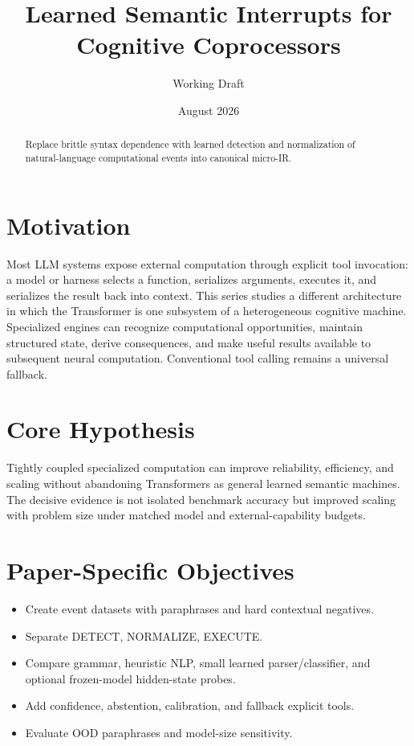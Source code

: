 \documentclass[11pt]{article}
\title{Learned Semantic Interrupts for Cognitive Coprocessors}
\author{Working Draft}
\date{August 2026}
\begin{document}
\maketitle
\begin{abstract}
Replace brittle syntax dependence with learned detection and normalization of natural-language computational events into canonical micro-IR.
\end{abstract}

\section{Motivation}
Most LLM systems expose external computation through explicit tool invocation: a model or harness selects a function, serializes arguments, executes it, and serializes the result back into context. This series studies a different architecture in which the Transformer is one subsystem of a heterogeneous cognitive machine. Specialized engines can recognize computational opportunities, maintain structured state, derive consequences, and make useful results available to subsequent neural computation. Conventional tool calling remains a universal fallback.

\section{Core Hypothesis}
Tightly coupled specialized computation can improve reliability, efficiency, and scaling without abandoning Transformers as general learned semantic machines. The decisive evidence is not isolated benchmark accuracy but improved scaling with problem size under matched model and external-capability budgets.

\section{Paper-Specific Objectives}
\begin{itemize}
\item Create event datasets with paraphrases and hard contextual negatives.
\item Separate DETECT, NORMALIZE, EXECUTE.
\item Compare grammar, heuristic NLP, small learned parser/classifier, and optional frozen-model hidden-state probes.
\item Add confidence, abstention, calibration, and fallback explicit tools.
\item Evaluate OOD paraphrases and model-size sensitivity.
\end{itemize}
\end{document}
